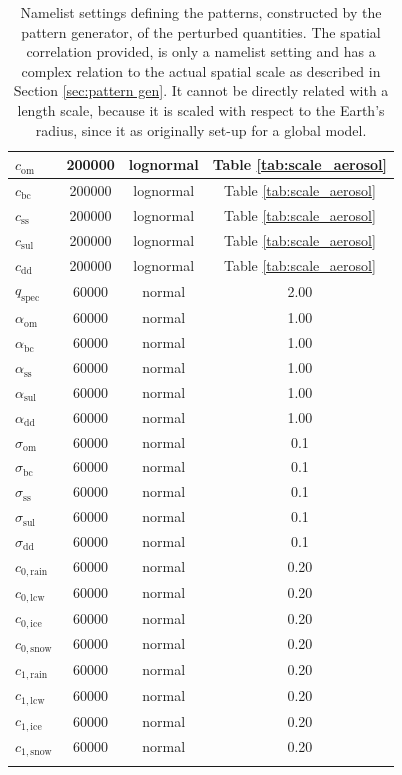 \begin{longtable}[H]{|l|c|c|c|}
    $c_{\mathrm{om}}$ &200000  & lognormal& Table \ref{tab:scale_aerosol} \\
    \hline
    $c_{\mathrm{bc}}$ & 200000  &lognormal & Table \ref{tab:scale_aerosol} \\
    \hline
    $c_{\mathrm{ss}}$ & 200000  & lognormal & Table \ref{tab:scale_aerosol} \\
    \hline
    $c_{\mathrm{sul}}$ & 200000  & lognormal & Table \ref{tab:scale_aerosol} \\
    \hline
    $c_{\mathrm{dd}}$ & 200000 &  lognormal &Table \ref{tab:scale_aerosol}  \\
    \hline
    $q_{\mathrm{spec}}$ & 60000  & normal & 2.00 \\
    \hline
    $\alpha_{\mathrm{om}}$ &60000  & normal&  1.00\\
    \hline
    $\alpha_{\mathrm{bc}}$ & 60000  &normal & 1.00 \\
    \hline
    $\alpha_{\mathrm{ss}}$ & 60000  & normal &  1.00\\
    \hline
    $\alpha_{\mathrm{sul}}$ & 60000  & normal & 1.00 \\
    \hline
    $\alpha_{\mathrm{dd}}$ & 60000  & normal & 1.00 \\
    \hline
    $\sigma_{\mathrm{om}}$ &60000  & normal& 0.1\\
    \hline
    $\sigma_{\mathrm{bc}}$ & 60000  &normal & 0.1\\
    \hline
    $\sigma_{\mathrm{ss}}$ & 60000  & normal &  0.1\\
    \hline
    $\sigma_{\mathrm{sul}}$ & 60000  & normal & 0.1\\
    \hline
    $\sigma_{\mathrm{dd}}$ & 60000  & normal & 0.1 \\
    \hline
    $c_{\mathrm{0,rain}}$ & 60000  & normal & 0.20 \\
    \hline
     $c_{\mathrm{0,lcw}}$ & 60000  & normal & 0.20 \\
    \hline
     $c_{\mathrm{0,ice}}$ & 60000  & normal & 0.20 \\
    \hline
     $c_{\mathrm{0,snow}}$ & 60000  & normal & 0.20 \\
    \hline
    $c_{\mathrm{1,rain}}$ & 60000  & normal & 0.20 \\
    \hline
     $c_{\mathrm{1,lcw}}$ & 60000  & normal & 0.20 \\
    \hline
     $c_{\mathrm{1,ice}}$ & 60000  & normal & 0.20 \\
    \hline
     $c_{\mathrm{1,snow}}$ & 60000  & normal & 0.20 \\
    \hline
     

    \caption{Namelist settings defining the patterns, constructed by the pattern generator, of the perturbed quantities. The spatial correlation provided, is only a namelist setting and has a complex relation to the actual spatial scale as described in Section \ref{sec:pattern gen}. It cannot be directly related with a length scale, because it is scaled with respect to the Earth's radius, since it as originally set-up for a global model. \label{tab:namelist_pert}}
\end{longtable}


